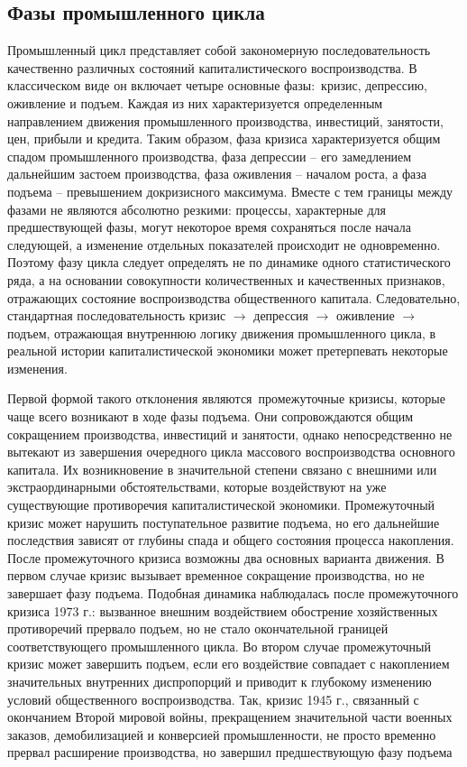 \subsection{Фазы промышленного цикла}
Промышленный цикл представляет собой закономерную последовательность качественно различных состояний капиталистического воспроизводства. В классическом виде он включает четыре основные фазы: кризис, депрессию, оживление и подъем. Каждая из них характеризуется определенным направлением движения промышленного производства, инвестиций, занятости, цен, прибыли и кредита. Таким образом, фаза кризиса характеризуется общим спадом промышленного производства, фаза депрессии – его замедлением дальнейшим застоем производства, фаза оживления – началом роста, а фаза подъема – превышением докризисного максимума. Вместе с тем границы между фазами не являются абсолютно резкими: процессы, характерные для предшествующей фазы, могут некоторое время сохраняться после начала следующей, а изменение отдельных показателей происходит не одновременно. Поэтому фазу цикла следует определять не по динамике одного статистического ряда, а на основании совокупности количественных и качественных признаков, отражающих состояние воспроизводства общественного капитала. Следовательно, стандартная последовательность \textquotedbl{}кризис $\to$ депрессия $\to$ оживление $\to$ подъем\textquotedbl{}, отражающая внутреннюю логику движения промышленного цикла, в реальной истории капиталистической экономики может претерпевать некоторые изменения.

Первой формой такого отклонения являются промежуточные кризисы, которые чаще всего возникают в ходе фазы подъема. Они сопровождаются общим сокращением производства, инвестиций и занятости, однако непосредственно не вытекают из завершения очередного цикла массового воспроизводства основного капитала. Их возникновение в значительной степени связано с внешними или экстраординарными обстоятельствами, которые воздействуют на уже существующие противоречия капиталистической экономики. Промежуточный кризис может нарушить поступательное развитие подъема, но его дальнейшие последствия зависят от глубины спада и общего состояния процесса накопления. После промежуточного кризиса возможны два основных варианта движения. В первом случае кризис вызывает временное сокращение производства, но не завершает фазу подъема. Подобная динамика наблюдалась после промежуточного кризиса 1973 г.: вызванное внешним воздействием обострение хозяйственных противоречий прервало подъем, но не стало окончательной границей соответствующего промышленного цикла. Во втором случае промежуточный кризис может завершить подъем, если его воздействие совпадает с накоплением значительных внутренних диспропорций и приводит к глубокому изменению условий общественного воспроизводства. Так, кризис 1945 г., связанный с окончанием Второй мировой войны, прекращением значительной части военных заказов, демобилизацией и конверсией промышленности, не просто временно прервал расширение производства, но завершил предшествующую фазу подъема

